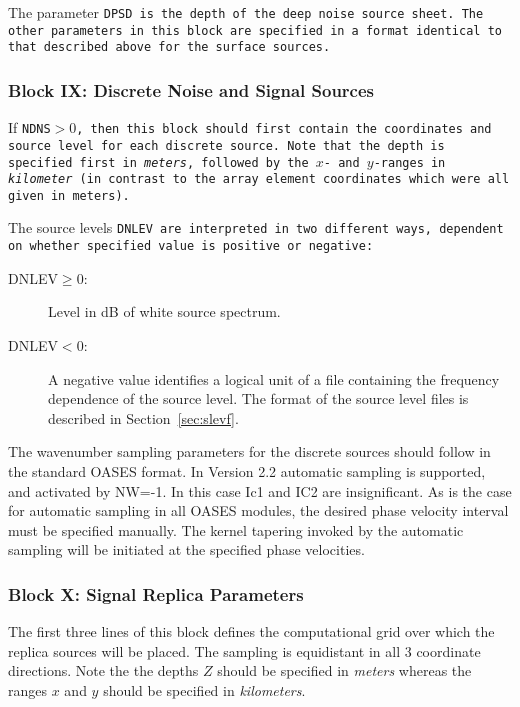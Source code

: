 The parameter \tt DPSD \rm is the depth of the deep noise source
sheet. The other parameters in this block are specified in a format
identical to that described above for the surface sources.

\subsubsection{Block IX: Discrete Noise and Signal Sources}

If \tt NDNS\rm$>0$, then this block should first contain the
coordinates and source level for each discrete source. Note that the
depth is specified first in {\em meters}, followed by the $x$- and
$y$-ranges in {\em kilometer} (in contrast to the array element
coordinates which were all given in meters).

The source levels \tt DNLEV \rm are interpreted in two different ways,
dependent on whether specified value is positive or negative:

\begin{description}
\item[DNLEV$\ge0$:] Level in dB of white source spectrum.
\item[DNLEV$<0$:] A negative value identifies a logical unit of a file
containing the frequency dependence of the source level. The format of
the source level files is described in Section~\ref{sec:slevf}.
\end{description}

The wavenumber sampling parameters for the discrete sources should
follow in the standard OASES format. In Version 2.2 automatic sampling
is supported, and activated by NW=-1. In this case Ic1 and IC2 are
insignificant. As is the case for automatic sampling in all OASES
modules, the desired phase velocity interval must be specified
manually. The kernel tapering invoked by the automatic sampling will
be initiated at the specified phase velocities.

   
\subsubsection{Block X: Signal Replica Parameters}

The first three lines of this block defines the computational grid
over which the replica sources will be placed. The sampling is
equidistant in all 3 coordinate directions. Note the the depths $Z$
should be specified in {\em meters} whereas the ranges $x$ and $y$ should
be  specified  in {\em kilometers}.

